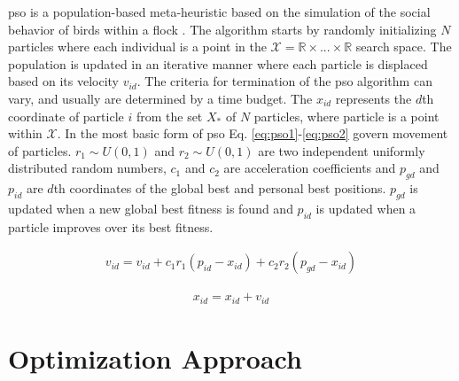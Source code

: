 \documentclass[runningheads,a4paper]{llncs}
\begin{document}



\ac{pso} is a population-based meta-heuristic based on the simulation of the social behavior of birds within a flock \cite{VanDenBergh:2002:APS:935867}. The algorithm starts by randomly initializing $N$ particles where each individual is a point in the $\mathcal{X} = \mathbb{R} \times ... \times \mathbb{R}$ search space. The population is updated in an iterative manner where each particle is displaced based on its velocity $v_{id}$. The criteria for termination of the \ac{pso} algorithm can vary, and usually are determined by a time budget. The $x_{id}$ represents the $d$th coordinate of particle $i$ from the set $X_*$ of $N$ particles, where particle is a point within $\mathcal{X}$. In the most basic form of \ac{pso} Eq. \ref{eq:pso1}-\ref{eq:pso2} govern movement of particles. $r_1 \sim U(0,1)$ and $r_2 \sim U(0,1)$ are two independent uniformly distributed random numbers, $c_1$ and $c_2$ are acceleration coefficients and $p_{gd}$ and $p_{id}$ are $d$th coordinates of the global best and personal best positions. $p_{gd}$ is updated when a new global best fitness is found and $p_{id}$ is updated when a particle improves over its best fitness.



\begin{align} 
\label{eq:pso1}
v_{id}=v_{id}+c_{1}r_{1}(p_{id}-x_{id}) + c_{2}r_{2}(p_{gd}-x_{id})
\end{align}



\begin{align} 
\label{eq:pso2}
x_{id}=x_{id}+v_{id} 
\end{align}


\section{Optimization Approach} 
\label{design}
\end{document}
